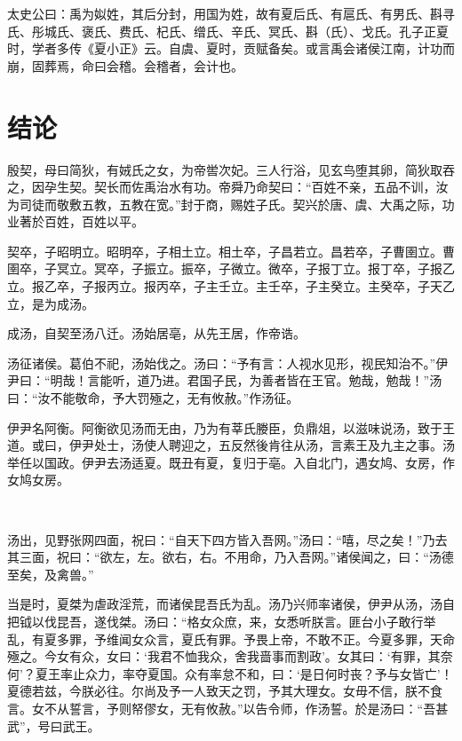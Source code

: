 \documentclass[UTF8,12pt,AutoFakeBold]{ctexart}
\begin{document}
太史公曰：禹为姒姓，其后分封，用国为姓，故有夏后氏、有扈氏、有男氏、斟寻氏、彤城氏、褒氏、费氏、杞氏、缯氏、辛氏、冥氏、斟（氏）、戈氏。孔子正夏时，学者多传《夏小正》云。自虞、夏时，贡赋备矣。或言禹会诸侯江南，计功而崩，固葬焉，命曰会稽。会稽者，会计也。







\newpage

\section{结论\label{章节：黑洞吸积模型}}
殷契，母曰简狄，有娀氏之女，为帝喾次妃。三人行浴，见玄鸟堕其卵，简狄取吞之，因孕生契。契长而佐禹治水有功。帝舜乃命契曰：“百姓不亲，五品不训，汝为司徒而敬敷五教，五教在宽。”封于商，赐姓子氏。契兴於唐、虞、大禹之际，功业著於百姓，百姓以平。

契卒，子昭明立。昭明卒，子相土立。相土卒，子昌若立。昌若卒，子曹圉立。曹圉卒，子冥立。冥卒，子振立。振卒，子微立。微卒，子报丁立。报丁卒，子报乙立。报乙卒，子报丙立。报丙卒，子主壬立。主壬卒，子主癸立。主癸卒，子天乙立，是为成汤。

成汤，自契至汤八迁。汤始居亳，从先王居，作帝诰。

汤征诸侯。葛伯不祀，汤始伐之。汤曰：“予有言：人视水见形，视民知治不。”伊尹曰：“明哉！言能听，道乃进。君国子民，为善者皆在王官。勉哉，勉哉！”汤曰：“汝不能敬命，予大罚殛之，无有攸赦。”作汤征。

伊尹名阿衡。阿衡欲见汤而无由，乃为有莘氏媵臣，负鼎俎，以滋味说汤，致于王道。或曰，伊尹处士，汤使人聘迎之，五反然後肯往从汤，言素王及九主之事。汤举任以国政。伊尹去汤适夏。既丑有夏，复归于亳。入自北门，遇女鸠、女房，作女鸠女房。
\begin{figure}[htb]
    \centering
    \\
    \captionsetup{font=footnotesize}
    \label{图：幂律参数空间}
\end{figure}
汤出，见野张网四面，祝曰：“自天下四方皆入吾网。”汤曰：“嘻，尽之矣！”乃去其三面，祝曰：“欲左，左。欲右，右。不用命，乃入吾网。”诸侯闻之，曰：“汤德至矣，及禽兽。”

当是时，夏桀为虐政淫荒，而诸侯昆吾氏为乱。汤乃兴师率诸侯，伊尹从汤，汤自把钺以伐昆吾，遂伐桀。汤曰：“格女众庶，来，女悉听朕言。匪台小子敢行举乱，有夏多罪，予维闻女众言，夏氏有罪。予畏上帝，不敢不正。今夏多罪，天命殛之。今女有众，女曰：‘我君不恤我众，舍我啬事而割政’。女其曰：‘有罪，其奈何’？夏王率止众力，率夺夏国。众有率怠不和，曰：‘是日何时丧？予与女皆亡’！夏德若兹，今朕必往。尔尚及予一人致天之罚，予其大理女。女毋不信，朕不食言。女不从誓言，予则帑僇女，无有攸赦。”以告令师，作汤誓。於是汤曰：“吾甚武”，号曰武王。
\end{document}
